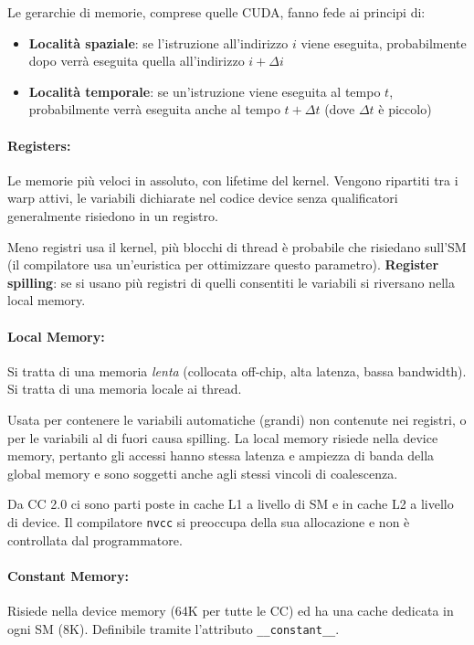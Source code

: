 Le gerarchie di memorie, comprese quelle CUDA, fanno fede ai principi di: 
\begin{itemize}
	\item \textbf{Località spaziale}: se l'istruzione all'indirizzo $i$ viene eseguita, probabilmente dopo verrà eseguita quella all'indirizzo $i + \Delta i$
	
	\item \textbf{Località temporale}: se un'istruzione viene eseguita al tempo $t$, probabilmente verrà eseguita anche al tempo $t + \Delta t$ (dove $\Delta t$ è piccolo)
\end{itemize}

\paragraph{Registers:} Le memorie più veloci in assoluto, con lifetime del kernel. Vengono ripartiti tra i warp attivi, le variabili dichiarate nel codice device senza qualificatori generalmente risiedono in un registro. 

Meno registri usa il kernel, più blocchi di thread è probabile che risiedano sull'SM (il compilatore usa un'euristica per ottimizzare questo parametro). \textbf{Register spilling}: se si usano più registri di quelli consentiti le variabili si riversano nella local memory.

\paragraph{Local Memory:} Si tratta di una memoria \textit{lenta} (collocata off-chip, alta latenza, bassa bandwidth). Si tratta di una memoria locale ai thread.

Usata per contenere le variabili automatiche (grandi) non contenute nei registri, o per le variabili al di fuori causa spilling. La local memory risiede nella device memory, pertanto gli accessi hanno stessa latenza e ampiezza di banda della global memory e sono soggetti anche agli stessi vincoli di coalescenza.

Da CC 2.0 ci sono parti poste in cache L1 a livello di SM e in cache L2 a livello di device. Il compilatore \texttt{nvcc} si preoccupa della sua allocazione e non è controllata dal programmatore.

\paragraph{Constant Memory:} Risiede nella device memory (64K per tutte le CC) ed ha una cache dedicata in ogni SM (8K). Definibile tramite l'attributo \texttt{\_\_constant\_\_}. 

